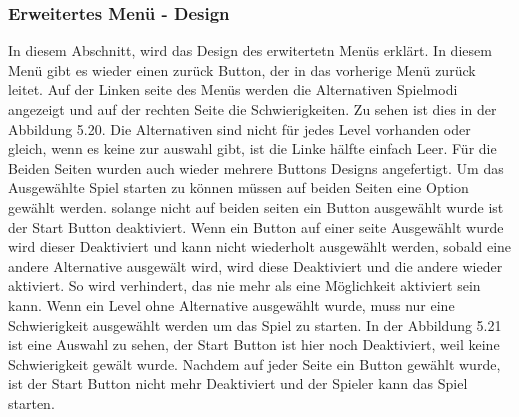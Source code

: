 \subsubsection{Erweitertes Menü - Design}
In diesem Abschnitt, wird das Design des erwitertetn Menüs erklärt. In diesem Menü gibt es wieder einen zurück Button, der in das vorherige Menü zurück leitet. Auf der Linken seite des Menüs werden die Alternativen Spielmodi angezeigt und auf der rechten Seite die Schwierigkeiten. Zu sehen ist dies in der Abbildung 5.20. Die Alternativen sind nicht für jedes Level vorhanden oder gleich, wenn es keine zur auswahl gibt, ist die Linke hälfte einfach Leer. Für die Beiden Seiten wurden auch wieder mehrere Buttons Designs angefertigt.
Um das Ausgewählte Spiel starten zu können müssen auf beiden Seiten eine Option gewählt werden. solange nicht auf beiden seiten ein Button ausgewählt wurde ist der Start Button deaktiviert. Wenn ein Button auf einer seite Ausgewählt wurde wird dieser Deaktiviert und kann nicht wiederholt ausgewählt werden, sobald eine andere Alternative ausgewält wird, wird diese Deaktiviert und die andere wieder aktiviert. So wird verhindert, das nie mehr als eine Möglichkeit aktiviert sein kann. Wenn ein Level ohne Alternative ausgewählt wurde, muss nur eine Schwierigkeit ausgewählt werden um das Spiel zu starten. In der Abbildung 5.21 ist eine Auswahl zu sehen, der Start Button ist hier noch Deaktiviert, weil keine Schwierigkeit gewält wurde. 
Nachdem auf jeder Seite ein Button gewählt wurde, ist der Start Button nicht mehr Deaktiviert und der Spieler kann das Spiel starten.
